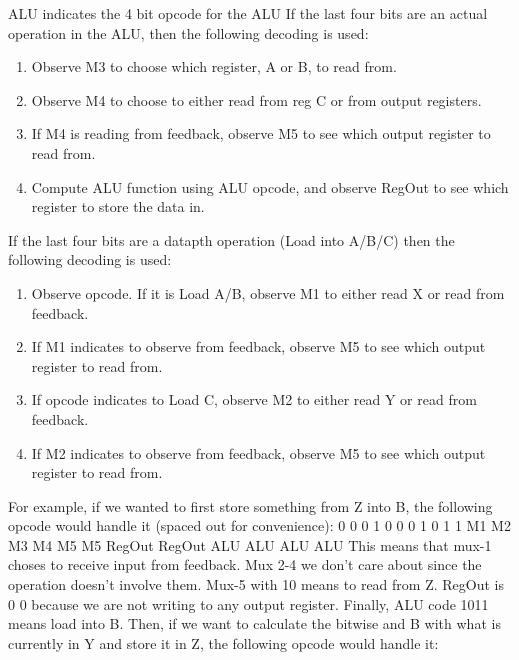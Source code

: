 \documentclass[12pt]{article}
\begin{document}
ALU indicates the 4 bit opcode for the ALU
\newline \newline
If the last four bits are an actual operation in the ALU, then the following decoding is used:
\begin{enumerate}
	\item Observe M3 to choose which register, A or B, to read from.
	\item Observe M4 to choose to either read from reg C or from output registers.
	\item If M4 is reading from feedback, observe M5 to see which output register to read from.
	\item Compute ALU function using ALU opcode, and observe RegOut to see which register to store the data in.
\end{enumerate}
If the last four bits are a datapth operation (Load into A/B/C) then the following decoding is used:
\begin{enumerate}
	\item Observe opcode. If it is Load A/B, observe M1 to either read X or read from feedback.
	\item If M1 indicates to observe from feedback, observe M5 to see which output register to read from.
	\item If opcode indicates to Load C, observe M2 to either read Y or read from feedback.
	\item If M2 indicates to observe from feedback, observe M5 to see which output register to read from.
\end{enumerate}
For example, if we wanted to first store something from Z into B, the following opcode would handle it (spaced out for convenience):
\newline {}  0  0  0  1  0  0      0      1   0   1   1
M1 M2 M3 M4 M5 M5 RegOut RegOut ALU ALU ALU ALU
\newline \newline
This means that mux-1 choses to receive input from feedback. Mux 2-4 we don't care about since the operation doesn't involve them. Mux-5 with 10 means to read from Z. RegOut is 0 0 because we are not writing to any output register. Finally, ALU code 1011 means load into B.
\newline \newline
Then, if we want to calculate the bitwise and B with what is currently in Y and store it in Z, the following opcode would handle it:
\newline \newline
\end{document}
